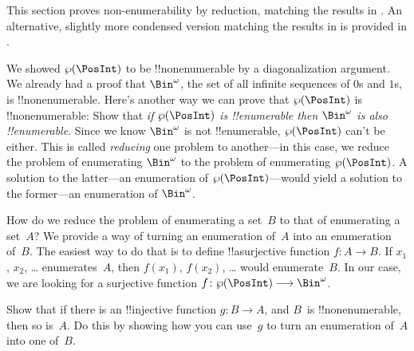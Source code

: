\documentclass[../../../include/open-logic-section]{subfiles}
\begin{document}


\begin{editorial}
  This section proves non-enumerability by reduction, matching the
  results in . An alternative, slightly more condensed
  version matching the results in  is provided in
  .
\end{editorial}

We showed $\Pow{\PosInt}$ to be !!{nonenumerable} by a diagonalization
argument. We already had a proof that $\Bin^\omega$, the set of all
infinite sequences of $0$s and $1$s, is !!{nonenumerable}.  Here's
another way we can prove that $\Pow{\PosInt}$ is !!{nonenumerable}:
Show that \emph{if $\Pow{\PosInt}$ is !!{enumerable} then $\Bin^\omega$
  is also !!{enumerable}}.  Since we know $\Bin^\omega$ is not
!!{enumerable}, $\Pow{\PosInt}$ can't be either.  This is called
\emph{reducing} one problem to another---in this case, we reduce the
problem of enumerating $\Bin^\omega$ to the problem of enumerating
$\Pow{\PosInt}$.  A solution to the latter---an enumeration of
$\Pow{\PosInt}$---would yield a solution to the former---an enumeration
of $\Bin^\omega$.

How do we reduce the problem of enumerating a set~$B$ to that of
enumerating a set~$A$?  We provide a way of turning an enumeration
of~$A$ into an enumeration of~$B$.  The easiest way to do that is to
define !!a{surjective} function $f\colon A \to B$.  If $x_1$, $x_2$,
\dots{} enumerates~$A$, then $f(x_1)$, $f(x_2)$, \dots{} would
enumerate~$B$.  In our case, we are looking for a surjective
function $f\colon \Pow{\PosInt} \to \Bin^\omega$.

\begin{prob}
Show that if there is an !!{injective} function $g\colon B \to A$, and
$B$~is !!{nonenumerable}, then so is~$A$. Do this by showing how you
can use~$g$ to turn an enumeration of~$A$ into one of~$B$.
\end{prob}
\end{document}
